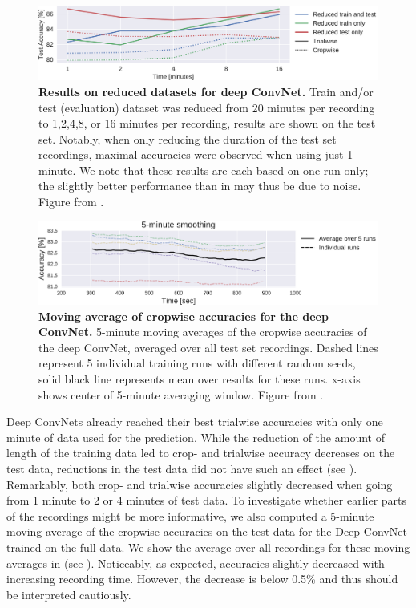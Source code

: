 \begin{figure}[htbp]
\myfloatalign
\includegraphics[width=\linewidth]{images/Time_Plot.pdf-1.png}
\caption{\textbf{Results on reduced datasets for deep ConvNet.} Train and/or test (evaluation) dataset was reduced from 20 minutes per recording to 1,2,4,8, or 16 minutes per recording, results are shown on the test set. Notably, when only reducing the duration of the test set recordings, maximal accuracies were observed  when using just 1 minute. We note that these results are each based on one run only; the slightly better performance than in  may thus be due to noise. Figure from \citet{schirrmeisterdeeppathology}.}
\label{pathology-time-fig}
\end{figure}

\begin{figure}[htbp]
\myfloatalign
\includegraphics[width=\linewidth]{images/Time_Crop_Pred_Plot.pdf-1.png}
\caption[Moving average of cropwise accuracies for the deep ConvNet.]{\textbf{Moving average of cropwise accuracies for the deep ConvNet.}
5-minute moving averages of the cropwise accuracies of the deep ConvNet, averaged over all test set recordings.
Dashed lines represent 5 individual training runs with different random seeds, solid black line represents mean over results for these runs.
x-axis shows center of 5-minute averaging window.
Figure from \citet{schirrmeisterdeeppathology}.}
\label{time-crop-pred-fig}
\end{figure}

    Deep ConvNets already reached their best trialwise accuracies with only
one minute of data used for the prediction. While the reduction of the
amount of length of the training data led to crop- and trialwise
accuracy decreases on the test data, reductions in the test data did not
have such an effect (see ).
Remarkably, both crop- and trialwise accuracies slightly decreased when
going from 1 minute to 2 or 4 minutes of test data. To investigate
whether earlier parts of the recordings might be more informative, we
also computed a 5-minute moving average of the cropwise accuracies on
the test data for the Deep ConvNet trained on the full data. We show the
average over all recordings for these moving averages in (see
). Noticeably, as expected,
accuracies slightly decreased with increasing recording time. However,
the decrease is below 0.5\% and thus should be interpreted cautiously.

